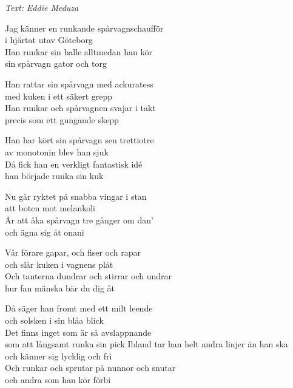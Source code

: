 {\footnotesize\textit{Text: Eddie Meduza}}\par
\vspace{10pt}
Jag känner en runkande spårvagnschaufför\\
i hjärtat utav Göteborg\\
Han runkar sin balle alltmedan han kör\\
sin spårvagn gator och torg\par
\vspace{7pt}
Han rattar sin spårvagn med ackuratess\\
med kuken i ett säkert grepp\\
Han runkar och spårvagnen svajar i takt\\
precis som ett gungande skepp\par
\vspace{7pt}
Han har kört sin spårvagn sen trettiotre\\
av monotonin blev han sjuk\\
Då fick han en verkligt fantastisk idé\\
han började runka sin kuk\par
\vspace{7pt}
Nu går ryktet på snabba vingar i stan\\
att boten mot melankoli\\
Är att åka spårvagn tre gånger om dan’\\
och ägna sig åt onani\par
\vspace{7pt}
Vår förare gapar, och fiser och rapar\\
och slår kuken i vagnens plåt\\
Och tanterna dundrar och stirrar och undrar\\
hur fan mänska bär du dig åt\par
\vspace{7pt}
Då säger han fromt med ett milt leende\\
och solsken i sin blåa blick\\
Det finns inget som är så avslappnande\\
som att långsamt runka sin pick
\newpage
Ibland tar han helt andra linjer än han ska\\
och känner sig lycklig och fri\\
Och runkar och sprutar på nunnor och snutar\\
och andra som han kör förbi\par
\vspace{10pt}
